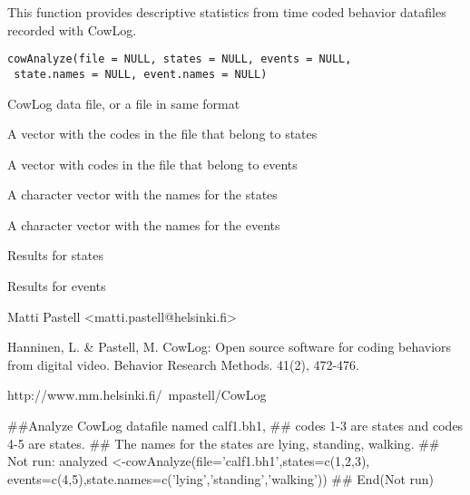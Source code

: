 \begin{Description}\relax
This function provides descriptive statistics from time coded behavior
datafiles recorded with CowLog.
\end{Description}
\begin{Usage}
\begin{verbatim}
cowAnalyze(file = NULL, states = NULL, events = NULL,
 state.names = NULL, event.names = NULL)
\end{verbatim}
\end{Usage}
\begin{Arguments}
\begin{ldescription}
\item[\code{file}] CowLog data file, or a file in same format
\item[\code{states}] A vector with the codes in the file that belong to states
\item[\code{events}] A vector with codes in the file that belong to events
\item[\code{state.names}] A character vector with the names for the states 
\item[\code{event.names}] A character vector with the names for the events
\end{ldescription}
\end{Arguments}
\begin{Value}
\begin{ldescription}
\item[\code{state}] Results for states
\item[\code{event}] Results for events
\end{ldescription}
\end{Value}
\begin{Author}\relax
Matti Pastell <matti.pastell@helsinki.fi>
\end{Author}
\begin{References}\relax
Hanninen, L. \& Pastell, M. CowLog: Open source software for coding
behaviors from digital video. Behavior Research Methods. 41(2),
472-476.

http://www.mm.helsinki.fi/~mpastell/CowLog
\end{References}
\begin{Examples}
\begin{ExampleCode}
##Analyze CowLog datafile named calf1.bh1,
## codes 1-3 are states and codes 4-5 are states.
## The names for the states are lying, standing, walking.
## Not run: 
analyzed <-cowAnalyze(file='calf1.bh1',states=c(1,2,3),
events=c(4,5),state.names=c('lying','standing','walking'))
## End(Not run)
 
\end{ExampleCode}
\end{Examples}

